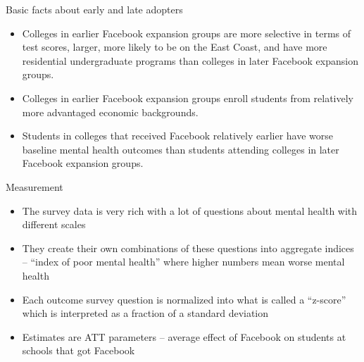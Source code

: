 \documentclass{beamer}
\begin{document}
\begin{frame}{Basic facts about early and late adopters}

\begin{itemize}
\item Colleges in earlier Facebook expansion groups are more selective in terms of test scores, larger, more likely to be on the East Coast, and have more residential undergraduate programs than colleges in later Facebook expansion groups. 

\item Colleges in earlier Facebook expansion groups enroll students from relatively more advantaged economic backgrounds. 

\item Students in colleges that received Facebook relatively earlier have worse baseline mental health outcomes than students attending colleges in later Facebook expansion groups. 


\end{itemize}

\end{frame}

\begin{frame}{Measurement}

\begin{itemize}
\item The survey data is very rich with a lot of questions about mental health with different scales
\item They create their own combinations of these questions into aggregate indices -- ``index of poor mental health'' where higher numbers mean worse mental health
\item Each outcome survey question is normalized into what is called a ``z-score'' which is interpreted as a fraction of a standard deviation
\item Estimates are ATT parameters -- average effect of Facebook on students at schools that got Facebook
\end{itemize}

\end{frame}
\end{document}
